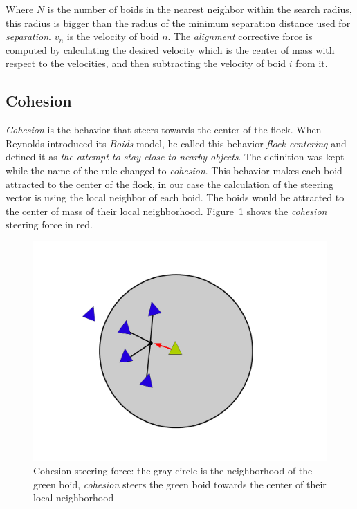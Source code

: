 Where $N$ is the number of boids in the nearest neighbor within the search radius, this radius is bigger than the radius of the minimum separation distance used for \textit{separation}. $v_n$ is the velocity of boid $n$. The \textit{alignment} corrective force is computed by calculating the desired velocity which is the center of mass with respect to the velocities, and then subtracting the velocity of boid $i$ from it.

\subsection{Cohesion}
\textit{Cohesion} is the behavior that steers towards the center of the flock. When Reynolds introduced its \textit{Boids} model, he called this behavior \textit{flock centering} and defined it as \textit{the attempt to stay close to nearby objects}. The definition was kept while the name of the rule changed to \textit{cohesion}. This behavior makes each boid attracted to the center of the flock, in our case the calculation of the steering vector is using the local neighbor of each boid. The boids would be attracted to the center of mass of their local neighborhood.  Figure~\ref{cohesionPDF} shows the \textit{cohesion} steering force in red.

\begin{figure}[htbp]
\begin{center}
\includegraphics[scale=0.3]{figures/cohesion.pdf}
\caption{Cohesion steering force: the gray circle is the neighborhood of the green boid, \textit{cohesion} steers the green boid towards the center of their local neighborhood}
\label{cohesionPDF}
\end{center}
\end{figure}

